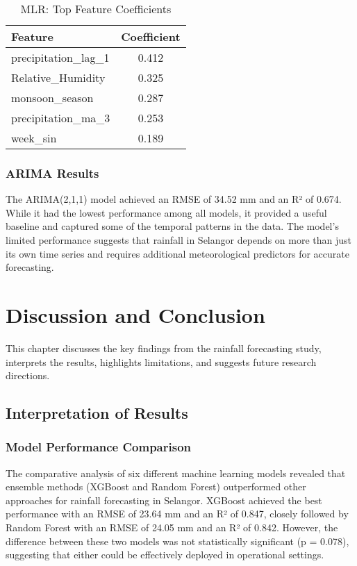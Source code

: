 \documentclass[12pt]{article}
\begin{document}
\begin{table}[h]
\centering
\caption{MLR: Top Feature Coefficients}
\label{tab:mlr_coefficients}
\begin{tabular}{|l|c|}
\hline
\textbf{Feature} & \textbf{Coefficient} \\
\hline
precipitation\_lag\_1 & 0.412 \\
\hline
Relative\_Humidity & 0.325 \\
\hline
monsoon\_season & 0.287 \\
\hline
precipitation\_ma\_3 & 0.253 \\
\hline
week\_sin & 0.189 \\
\hline
\end{tabular}
\end{table}

\subsection{ARIMA Results}
\label{subsec:arima_results}

The ARIMA(2,1,1) model achieved an RMSE of 34.52 mm and an R² of 0.674. While it had the lowest performance among all models, it provided a useful baseline and captured some of the temporal patterns in the data. The model's limited performance suggests that rainfall in Selangor depends on more than just its own time series and requires additional meteorological predictors for accurate forecasting.

\chapter{Discussion and Conclusion}
\label{chap:discussion}

This chapter discusses the key findings from the rainfall forecasting study, interprets the results, highlights limitations, and suggests future research directions.

\section{Interpretation of Results}
\label{sec:interpretation}

\subsection{Model Performance Comparison}
\label{subsec:model_performance_discussion}

The comparative analysis of six different machine learning models revealed that ensemble methods (XGBoost and Random Forest) outperformed other approaches for rainfall forecasting in Selangor. XGBoost achieved the best performance with an RMSE of 23.64 mm and an R² of 0.847, closely followed by Random Forest with an RMSE of 24.05 mm and an R² of 0.842. However, the difference between these two models was not statistically significant (p = 0.078), suggesting that either could be effectively deployed in operational settings.
\end{document}
